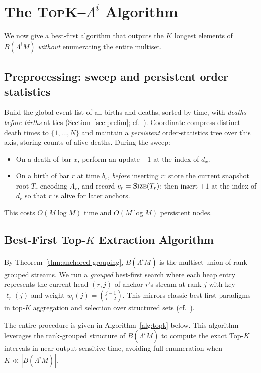 \documentclass[runningheads]{llncs}
\newcommand{\B}{B}
\newcommand{\Lam}{\Lambda}
\begin{document}
\section{The \textsc{TopK}--$\Lam^i$ Algorithm}\label{sec:algorithm}

We now give a best‑first algorithm that outputs the $K$ longest elements of $\B(\Lam^i M)$ \emph{without} enumerating the entire multiset.

\subsection{Preprocessing: sweep and persistent order statistics}
Build the global event list of all births and deaths, sorted by time, with \emph{deaths before births} at ties (Section~\ref{sec:prelim}; cf.\ \cite{ELZ02,EdelsbrunnerHarer10}). Coordinate-compress distinct death times to $\{1,\dots,N\}$ and maintain a \emph{persistent} order‑statistics tree over this axis, storing counts of alive deaths.
During the sweep:
\begin{itemize}
  \item On a death of bar $x$, perform an update $-1$ at the index of $d_x$.
  \item On a birth of bar $r$ at time $b_r$, \emph{before} inserting $r$:
    store the current snapshot root $T_r$ encoding $A_r$, and record $c_r=\textsc{Size}(T_r)$; then insert $+1$ at the index of $d_r$ so that $r$ is alive for later anchors.
\end{itemize}
This costs $O(M\log M)$ time and $O(M\log M)$ persistent nodes.

\subsection{Best-First Top-$K$ Extraction Algorithm}
By Theorem~\ref{thm:anchored-grouping}, $\B(\Lam^i M)$ is the multiset union of rank–grouped streams. We run a \emph{grouped} best‑first search where each heap entry represents the current head $(r,j)$ of anchor $r$’s stream at rank $j$ with key $\ell_r(j)$ and weight $w_i(j)=\binom{j-1}{i-2}$. This mirrors classic best‑first paradigms in top‑$K$ aggregation and selection over structured sets (cf.\ \cite{Fagin03,FredericksonJohnson84}). 

The entire procedure is given in Algorithm~\ref{alg:topk} below.
This algorithm leverages the rank-grouped structure of 
$\B(\Lambda^i M)$ to compute the exact Top-$K$ intervals in near 
output-sensitive time, avoiding full enumeration when $K\ll|\B(\Lambda^i M)|$.
\end{document}
